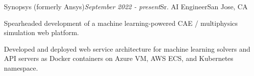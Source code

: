 \begin{rSubsection}{Synopsys (formerly Ansys)}{\em September 2022 - present}{Sr. AI Engineer}{San Jose, CA}
\item Spearheaded development of a machine learning-powered CAE / multiphysics simulation web platform.
\item Developed and deployed web service architecture for machine learning solvers and API servers as Docker containers on Azure VM, AWS ECS, and Kubernetes namespace.
\end{rSubsection}